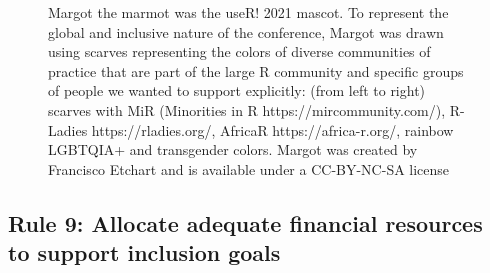 \documentclass[10pt,letterpaper]{article}
\begin{document}
\begin{figure}[!h]
\centering
{}
\caption{Margot the marmot was the useR! 2021 mascot. To represent the global and inclusive nature of the conference, Margot was drawn using scarves representing the colors of diverse communities of practice that are part of the large R community and specific groups of people we wanted to support explicitly: (from left to right) scarves with MiR (Minorities in R https://mircommunity.com/), R-Ladies https://rladies.org/, AfricaR https://africa-r.org/, rainbow LGBTQIA+ and transgender colors. Margot was created by Francisco Etchart and is available under a CC-BY-NC-SA license} 
\label{fig:marmots}
\end{figure}
\subsection*{Rule 9: Allocate adequate financial resources to support inclusion goals}
\label{rule_financial}
\end{document}

